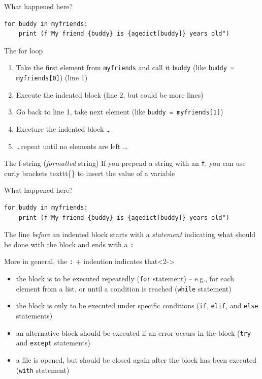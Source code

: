 \documentclass{beamer}
\begin{document}
\begin{frame}[fragile]{What happened here?}

\begin{lstlisting}
for buddy in myfriends:
    print (f"My friend {buddy} is {agedict[buddy]} years old")
\end{lstlisting}

\small
	\begin{block}{The for loop}
\begin{enumerate}
	\item Take the first element from \texttt{myfriends} and call it \texttt{buddy} (like \texttt{buddy = myfriends[0]}) (line 1)
	\item Execute the indented block (line 2, but could be more lines)
	\item Go back to line 1, take next element  (like \texttt{buddy = myfriends[1]}) 
	\item Execture the indented block \ldots
	\item \ldots repeat until no elements are left \ldots
\end{enumerate}
	\end{block}
	
	\begin{block}{The f-string (\emph{formatted} string)}
If you prepend a string with an \texttt{f}, you can use curly brackets texttt{\{\}} to insert the value of a variable
	\end{block}
	
\end{frame}




\begin{frame}[fragile]{What happened here?}
\begin{lstlisting}
for buddy in myfriends:
    print (f"My friend {buddy} is {agedict[buddy]} years old")
\end{lstlisting}
\small
The line \emph{before} an indented block starts with a \emph{statement} indicating what should be done with the block and ends with a \texttt{:}

\footnotesize
\begin{block}{More in general, the \texttt{:} + indention indicates that}<2->
	\begin{itemize}
		\item<3-> the block is to be executed repeatedly (\texttt{for} statement) – e.g., for each element from a list, or until a condition is reached (\texttt{while} statement)
		\item<4-> the block is only to be executed under specific conditions (\texttt{if}, \texttt{elif}, and \texttt{else} statements)
		\item<5-> an alternative block should be executed if an error occurs in the block (\texttt{try} and \texttt{except} statements)
		\item<6-> a file is opened, but should be closed again after the block has been executed (\texttt{with} statement)
	\end{itemize}
\end{block}
\end{frame}
\end{document}
